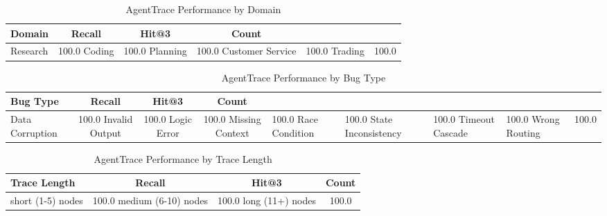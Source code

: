 
\begin{table}[t]
\centering
\caption{AgentTrace Performance by Domain}
\label{tab:domain_ablation}
\begin{tabular}{lccc}
\toprule
\textbf{Domain} & \textbf{Recall} & \textbf{Hit@3} & \textbf{Count} \\
\midrule
Research & 100.0%
Coding & 100.0%
Planning & 100.0%
Customer Service & 100.0%
Trading & 100.0%

\bottomrule
\end{tabular}
\end{table}



\begin{table}[t]
\centering
\caption{AgentTrace Performance by Bug Type}
\label{tab:bugtype_ablation}
\begin{tabular}{lccc}
\toprule
\textbf{Bug Type} & \textbf{Recall} & \textbf{Hit@3} & \textbf{Count} \\
\midrule
Data Corruption & 100.0%
Invalid Output & 100.0%
Logic Error & 100.0%
Missing Context & 100.0%
Race Condition & 100.0%
State Inconsistency & 100.0%
Timeout Cascade & 100.0%
Wrong Routing & 100.0%

\bottomrule
\end{tabular}
\end{table}



\begin{table}[t]
\centering
\caption{AgentTrace Performance by Trace Length}
\label{tab:length_ablation}
\begin{tabular}{lccc}
\toprule
\textbf{Trace Length} & \textbf{Recall} & \textbf{Hit@3} & \textbf{Count} \\
\midrule
short (1-5) nodes & 100.0%
medium (6-10) nodes & 100.0%
long (11+) nodes & 100.0%

\bottomrule
\end{tabular}
\end{table}



